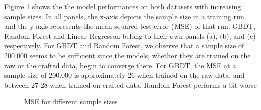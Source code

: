 Figure \ref{fig:convergences} shows the the model performances on both datasets with increasing sample sizes. In all panels, the x-axis depicts the sample size in a training run, and the y-axis represents the mean squared test error (MSE) of that run. GBDT, Random Forest and Linear Regresson belong to their own panels (a), (b), and (c) respectively. For GBDT and Random Forest, we observe that a sample size of 200.000 seems to be sufficient since the models, whether they are trained on the raw or the crafted data, begin to converge there. For GBDT, the MSE at a sample size of 200.000 is approximately 26 when trained on the raw data, and between 27-28 when trained on crafted data. Random Forest performs a bit worse 
\begin{figure}[h]
	\centering
	\caption{MSE for different sample sizes}
	\label{fig:convergences}
\end{figure}
